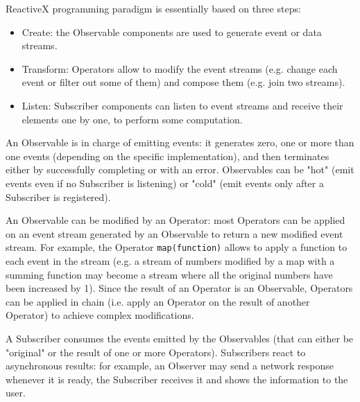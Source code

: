 \documentclass[11pt,a4paper,notitlepage]{article}
\begin{document}
ReactiveX programming paradigm is essentially based on three steps:
\begin{itemize}
	\item Create: the Observable components are used to generate event or data streams.
	\item Transform: Operators allow to modify the event streams (e.g. change each event or filter out some of them) and compose them (e.g. join two streams).
	\item Listen: Subscriber components can listen to event streams and receive their elements one by one, to perform some computation.
\end{itemize}
An Observable is in charge of emitting events: it generates zero, one or more than one events (depending on the specific implementation), and then terminates either by successfully completing or with an error. Observables can be "hot" (emit events even if no Subscriber is listening) or "cold" (emit events only after a Subscriber is registered).

An Observable can be modified by an Operator: most Operators can be applied on an event stream generated by an Observable to return a new modified event stream. For example, the Operator \texttt{map(function)} allows to apply a function to each event in the stream (e.g. a stream of numbers modified by a map with a summing function may become a stream where all the original numbers have been increased by 1). Since the result of an Operator is an Observable, Operators can be applied in chain (i.e. apply an Operator on the result of another Operator) to achieve complex modifications.

A Subscriber consumes the events emitted by the Observables (that can either be "original" or the result of one or more Operators). Subscribers react to asynchronous results: for example, an Observer may send a network response whenever it is ready, the Subscriber receives it and shows the information to the user.
\end{document}
